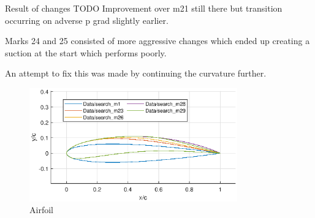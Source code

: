 \documentclass{article}
\begin{document}
Result of changes TODO
Improvement over m21 still there but transition occurring on adverse p grad slightly earlier. 

Marks 24 and 25 consisted of more aggressive changes which ended up creating a suction at the start which performs poorly.

An attempt to fix this was made by continuing the curvature further. 

\begin{figure}[H]
    \centering
    \includegraphics[width=0.8\textwidth]{figures/loRe_geometry_29.eps}
    \caption{Airfoil}
    \label{fig:m29_geometry}
\end{figure}
\end{document}
